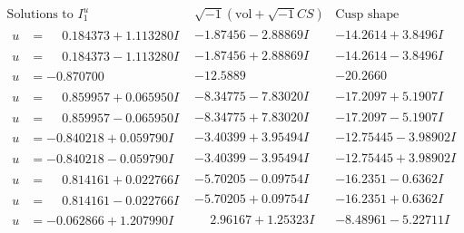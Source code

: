 \documentclass[1p]{elsarticle_modified}
\theoremstyle{definition}
\newcommand{\I}{\sqrt{-1}}
\begin{document}
$$\begin{array}{c|c|c}  
\text{Solutions to }I^u_{1}& \I (\text{vol} + \sqrt{-1}CS) & \text{Cusp shape}\\
 \hline 
\begin{aligned}
u &= \phantom{-}0.184373 + 1.113280 I\end{aligned}
 & -1.87456 - 2.88869 I & -14.2614 + 3.8496 I \\ \hline\begin{aligned}
u &= \phantom{-}0.184373 - 1.113280 I\end{aligned}
 & -1.87456 + 2.88869 I & -14.2614 - 3.8496 I \\ \hline\begin{aligned}
u &= -0.870700\phantom{ +0.000000I}\end{aligned}
 & -12.5889\phantom{ +0.000000I} & -20.2660\phantom{ +0.000000I} \\ \hline\begin{aligned}
u &= \phantom{-}0.859957 + 0.065950 I\end{aligned}
 & -8.34775 - 7.83020 I & -17.2097 + 5.1907 I \\ \hline\begin{aligned}
u &= \phantom{-}0.859957 - 0.065950 I\end{aligned}
 & -8.34775 + 7.83020 I & -17.2097 - 5.1907 I \\ \hline\begin{aligned}
u &= -0.840218 + 0.059790 I\end{aligned}
 & -3.40399 + 3.95494 I & -12.75445 - 3.98902 I \\ \hline\begin{aligned}
u &= -0.840218 - 0.059790 I\end{aligned}
 & -3.40399 - 3.95494 I & -12.75445 + 3.98902 I \\ \hline\begin{aligned}
u &= \phantom{-}0.814161 + 0.022766 I\end{aligned}
 & -5.70205 - 0.09754 I & -16.2351 - 0.6362 I \\ \hline\begin{aligned}
u &= \phantom{-}0.814161 - 0.022766 I\end{aligned}
 & -5.70205 + 0.09754 I & -16.2351 + 0.6362 I \\ \hline\begin{aligned}
u &= -0.062866 + 1.207990 I\end{aligned}
 & \phantom{-}2.96167 + 1.25323 I & -8.48961 - 5.22711 I \\ \hline\begin{aligned}

\end{aligned}
\end{array}$$
\end{document}

